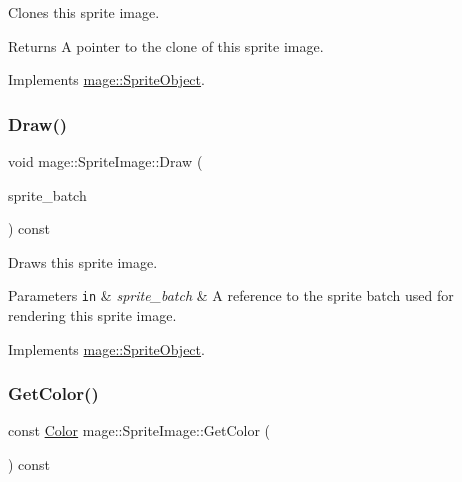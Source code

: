 Clones this sprite image.

\begin{DoxyReturn}{Returns}
A pointer to the clone of this sprite image. 
\end{DoxyReturn}


Implements \hyperlink{classmage_1_1_sprite_object_acbbe3d5894e5a43df411b7e5785ae174}{mage\+::\+Sprite\+Object}.

\hypertarget{classmage_1_1_sprite_image_ae30d3293931f674fea17008063755bb6}{}\label{classmage_1_1_sprite_image_ae30d3293931f674fea17008063755bb6} 
\subsubsection{\texorpdfstring{Draw()}{Draw()}}
{\footnotesize\ttfamily void mage\+::\+Sprite\+Image\+::\+Draw (\begin{DoxyParamCaption}\item[{Sprite\+Batch \&}]{sprite\+\_\+batch }\end{DoxyParamCaption}) const\hspace{0.3cm}{\ttfamily [virtual]}}

Draws this sprite image.


\begin{DoxyParams}[1]{Parameters}
\mbox{\tt in}  & {\em sprite\+\_\+batch} & A reference to the sprite batch used for rendering this sprite image. \\
\hline
\end{DoxyParams}


Implements \hyperlink{classmage_1_1_sprite_object_a1c1c885fe7846f7ee1cc0b73571c2fa0}{mage\+::\+Sprite\+Object}.

\hypertarget{classmage_1_1_sprite_image_aa04711b85cbe98493edd8767ac3348b5}{}\label{classmage_1_1_sprite_image_aa04711b85cbe98493edd8767ac3348b5} 
\subsubsection{\texorpdfstring{Get\+Color()}{GetColor()}}
{\footnotesize\ttfamily const \hyperlink{structmage_1_1_color}{Color} mage\+::\+Sprite\+Image\+::\+Get\+Color (\begin{DoxyParamCaption}{ }\end{DoxyParamCaption}) const\hspace{0.3cm}{\ttfamily [noexcept]}}

